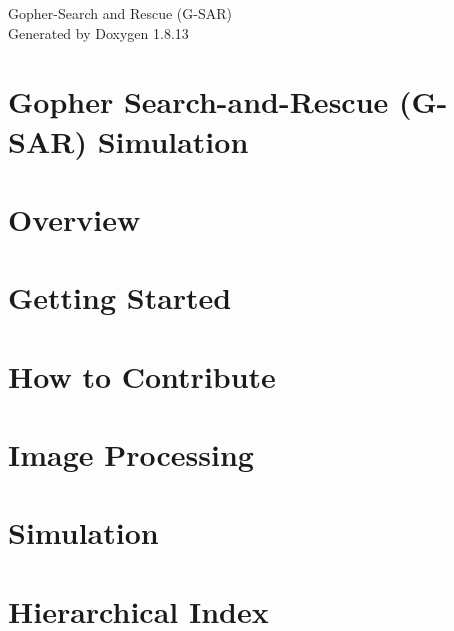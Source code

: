 \documentclass[twoside]{book}
\newcommand{\+}{\discretionary{\mbox{\scriptsize$\hookleftarrow$}}{}{}}
\newcommand{\clearemptydoublepage}{%
  \newpage{\pagestyle{empty}\cleardoublepage}%
}
\begin{document}
\hypersetup{pageanchor=false,
             bookmarksnumbered=true,
             pdfencoding=unicode
            }
\begin{titlepage}
\vspace*{7cm}
\begin{center}%
{\Large Gopher-\/\+Search and Rescue (G-\/\+S\+AR) }\\
\vspace*{1cm}
{\large Generated by Doxygen 1.8.13}\\
\end{center}
\end{titlepage}
\clearemptydoublepage
{}
\tableofcontents
\clearemptydoublepage
{}
\hypersetup{pageanchor=true}

\chapter{Gopher Search-\/and-\/\+Rescue (G-\/\+S\+AR) Simulation}
\label{index}\hypertarget{index}{}
\chapter{Overview}
\label{overview}

\chapter{Getting Started}
\label{getting-started}

\chapter{How to Contribute}
\label{contributing}

\chapter{Image Processing}
\label{image-processing}

\chapter{Simulation}
\label{simulation}

\chapter{Hierarchical Index}

\end{document}
